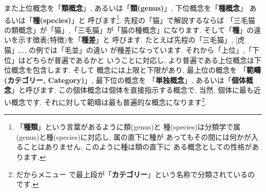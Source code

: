 また上位概念を「\textbf{類概念}」, あるいは「\textbf{類(genus)}」,
 下位概念を「\textbf{種概念}」 あるいは「\textbf{種(species)}」と
呼びます\footnote{「\textbf{種類}」という言葉があるように類(genus)と
種(species)は分類学で属(genus)と種(species)に対応し, 属の直下に種が
あってもその間には何かが入ることはありません. このように種は類の直下に
ある概念としての性格があります.}. 先程の「猫」で解説するならば
「三毛猫の類概念」が「猫」,「三毛猫」が「猫の種概念」になります.
 そして「\textbf{種}」の違いを示す徴表(特徴)を「\textbf{種差}」と
呼びます. たとえば先程の「三毛猫」, [虎猫」,... の例では「毛並」の違い
が種差になっています. それから「上位」,「下位」はどちらが普遍であるかと
いうことに対応し, より普遍である上位概念は下位概念を包含します. そして
概念には上限と下限があり, 最上位の概念を
「\textbf{範疇(カテゴリー, Category)}」, 最下位の概念を
「\textbf{単独概念}」, あるいは「\textbf{個体概念}」と呼びます.
 この個体概念は個体を直接指示する概念で, 当然, 個体に最も近い概念です.
 それに対して範疇は最も普遍的な概念になります\footnote{だからメニュー
で最上段が「\textbf{カテゴリー}」という名称で分類されているのです.}.
\newline


